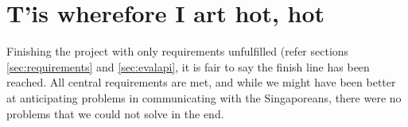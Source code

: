 \section{T'is wherefore I art hot, hot}
Finishing the project with only requirements unfulfilled (refer sections
\ref{sec:requirements} and \ref{sec:evalapi}, it is fair to say the finish line
has been reached. All central requirements are met, and while we might have been
better at anticipating problems in communicating with the Singaporeans, there
were no problems that we could not solve in the end.
